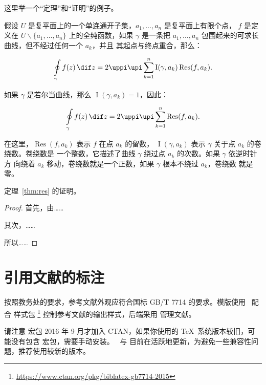 这里举一个“定理”和“证明”的例子。
\begin{theorem}[留数定理]
\label{thm:res}
  假设 $U$ 是复平面上的一个单连通开子集，$a_1, \ldots, a_n$ 是复平面上有限个点，
  $f$ 是定义在 $U \backslash \{a_1, \ldots, a_n\}$ 上的全纯函数，如果 $\gamma$
  是一条把 $a_1, \ldots, a_n$ 包围起来的可求长曲线，但不经过任何一个 $a_k$，并且
  其起点与终点重合，那么：

  \begin{equation}
    \label{eq:res}
    \oint\limits_\gamma f(z)\, \dif z = 2\uppi \upi \sum_{k=1}^n \operatorname{I}(\gamma, a_k) \operatorname{Res}(f, a_k).
  \end{equation}

  如果 $\gamma$ 是若尔当曲线，那么 $\operatorname{I}(\gamma, a_k) = 1$，因此：

  \begin{equation}
    \label{eq:resthm}
    \oint\limits_\gamma f(z)\, \dif z = 2\uppi \upi \sum_{k=1}^n \operatorname{Res}(f, a_k).
  \end{equation}

  在这里，$\operatorname{Res}(f, a_k)$ 表示 $f$ 在点 $a_k$ 的留数，
  $\operatorname{I}(\gamma, a_k)$ 表示 $\gamma$ 关于点 $a_k$ 的卷绕数。卷绕数是
  一个整数，它描述了曲线 $\gamma$ 绕过点 $a_k$ 的次数。如果 $\gamma$ 依逆时针方
  向绕着 $a_k$ 移动，卷绕数就是一个正数，如果 $\gamma$ 根本不绕过 $a_k$，卷绕数
  就是零。

  定理~\ref{thm:res} 的证明。

  \begin{proof}
    首先，由……

    其次，……

    所以……
  \end{proof}
\end{theorem}

\section{引用文献的标注}

按照教务处的要求，参考文献外观应符合国标 GB/T 7714 的要求。模版使用 \BibLaTeX\
配合  样式包
\footnote{\url{https://www.ctan.org/pkg/biblatex-gb7714-2015}}
控制参考文献的输出样式，后端采用  管理文献。

请注意  宏包 2016 年 9 月才加入 CTAN，如果你使用的
\TeX\ 系统版本较旧，可能没有包含  宏包，需要手动安装。
\BibLaTeX\ 与 \pkg{biblatex-gb7714-2015} 目前在活跃地更新，为避免一些兼容性问
题，推荐使用较新的版本。

